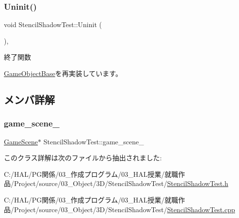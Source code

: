 \subsubsection{\texorpdfstring{Uninit()}{Uninit()}}
{\footnotesize\ttfamily void Stencil\+Shadow\+Test\+::\+Uninit (\begin{DoxyParamCaption}{ }\end{DoxyParamCaption})\hspace{0.3cm}{\ttfamily [override]}, {\ttfamily [virtual]}}



終了関数 



\mbox{\hyperlink{class_game_object_base_a97e1bc277d7b1c0156d4735de29a022c}{Game\+Object\+Base}}を再実装しています。



\subsection{メンバ詳解}
\mbox{\label{class_stencil_shadow_test_ac108faf317516a8335f73ca8005fbb20}} 
\subsubsection{\texorpdfstring{game\+\_\+scene\+\_\+}{game\_scene\_}}
{\footnotesize\ttfamily \mbox{\hyperlink{class_game_scene}{Game\+Scene}}$\ast$ Stencil\+Shadow\+Test\+::game\+\_\+scene\+\_\+}



このクラス詳解は次のファイルから抽出されました\+:\begin{DoxyCompactItemize}
\item 
C\+:/\+H\+A\+L/\+P\+G関係/03\+\_\+作成プログラム/03\+\_\+\+H\+A\+L授業/就職作品/\+Project/source/03\+\_\+\+Object/3\+D/\+Stencil\+Shadow\+Test/\mbox{\hyperlink{_stencil_shadow_test_8h}{Stencil\+Shadow\+Test.\+h}}\item 
C\+:/\+H\+A\+L/\+P\+G関係/03\+\_\+作成プログラム/03\+\_\+\+H\+A\+L授業/就職作品/\+Project/source/03\+\_\+\+Object/3\+D/\+Stencil\+Shadow\+Test/\mbox{\hyperlink{_stencil_shadow_test_8cpp}{Stencil\+Shadow\+Test.\+cpp}}\end{DoxyCompactItemize}
